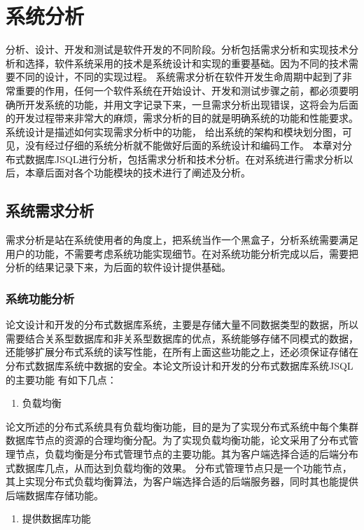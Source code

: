 
\chapter{系统分析}
分析、设计、开发和测试是软件开发的不同阶段。分析包括需求分析和实现技术分析和选择，软件系统采用的技术是系统设计和实现的重要基础。因为不同的技术需要不同的设计，不同的实现过程。
系统需求分析在软件开发生命周期中起到了非常重要的作用，任何一个软件系统在开始设计、开发和测试步骤之前，都必须要明确所开发系统的功能，并用文字记录下来，一旦需求分析出现错误，这将会为后面的开发过程带来非常大的麻烦，需求分析的目的就是明确系统的功能和性能要求。系统设计是描述如何实现需求分析中的功能，
给出系统的架构和模块划分图，可见，没有经过仔细的系统分析就不能做好后面的系统设计和编码工作。
本章对分布式数据库JSQL进行分析，包括需求分析和技术分析。在对系统进行需求分析以后，本章后面对各个功能模块的技术进行了阐述及分析。
\section{系统需求分析}
需求分析是站在系统使用者的角度上，把系统当作一个黑盒子，分析系统需要满足用户的功能，不需要考虑系统功能实现细节。在对系统功能分析完成以后，需要把分析的结果记录下来，为后面的软件设计提供基础。
\subsection{系统功能分析}
论文设计和开发的分布式数据库系统，主要是存储大量不同数据类型的数据，所以需要结合关系型数据库和非关系型数据库的优点，系统能够存储不同模式的数据，还能够扩展分布式系统的读写性能，在所有上面这些功能之上，还必须保证存储在分布式数据库系统中数据的安全。本论文所设计和开发的分布式数据库系统JSQL的主要功能
有如下几点：


	\begin{enumerate}
		\item 负载均衡
	\end{enumerate}


	论文所述的分布式系统具有负载均衡功能，目的是为了实现分布式系统中每个集群数据库节点的资源的合理均衡分配。为了实现负载均衡功能，论文采用了分布式管理节点，负载均衡是分布式管理节点的主要功能。其为客户端选择合适的后端分布式数据库几点，从而达到负载均衡的效果。
	分布式管理节点只是一个功能节点，其上实现分布式负载均衡算法，为客户端选择合适的后端服务器，同时其也能提供后端数据库存储功能。
	
	\begin{enumerate}[resume]
		\item 提供数据库功能
	\end{enumerate}

